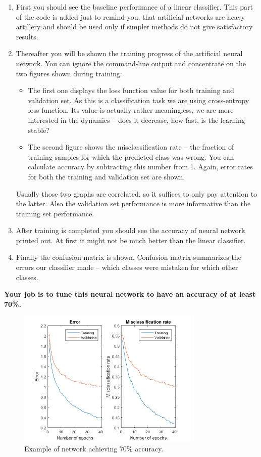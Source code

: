 \documentclass[a4paper,11pt]{article}
\begin{document}
\begin{enumerate}
	\item First you should see the baseline performance of a linear classifier. This part of the code is added just to remind you, that artificial networks are heavy artillery and should be used only if simpler methods do not give satisfactory results. 
	\item Thereafter you will be shown the training progress of the artificial neural network. You can ignore the command-line output and concentrate on the two figures shown during training:
	\begin{itemize}
		\item The first one displays the loss function value for both training and validation set. As this is a classification task we are using cross-entropy loss function. Its value is actually rather meaningless, we are more interested in the dynamics -- does it decrease, how fast, is the learning stable?
		\item The second figure shows the misclassification rate -- the fraction of training samples for which the predicted class was wrong. You can calculate accuracy by subtracting this number from 1. Again, error rates for both the training and validation set are shown.
	\end{itemize}
	Usually those two graphs are correlated, so it suffices to only pay attention to the latter. Also the validation set performance is more informative than the training set performance.
	\item After training is completed you should see the accuracy of neural network printed out. At first it might not be much better than the linear classifier.
	\item Finally the confusion matrix is shown. Confusion matrix summarizes the errors our classifier made -- which classes were mistaken for which other classes.
\end{enumerate}

\textbf{Your job is to tune this neural network to have an accuracy of at least 70\%.}\\

\begin{figure}[h]
	\centering
	\includegraphics[width=0.78\textwidth]{training_loss.png}
	\caption{Example of network achieving 70\% accuracy.}
\end{figure}
\end{document}
